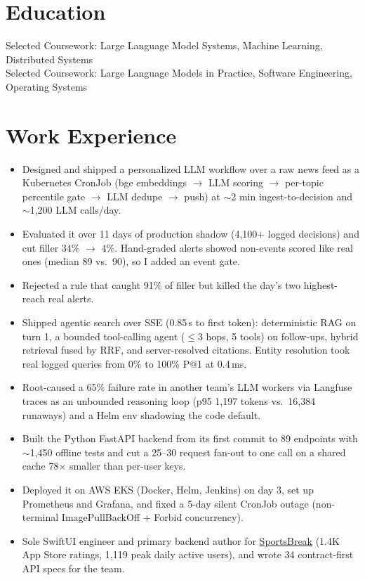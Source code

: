 \documentclass[11pt, letterpaper]{article}
\begin{document}

\section{Education}
Selected Coursework: Large Language Model Systems, Machine Learning, Distributed Systems\\[1pt]
Selected Coursework: Large Language Models in Practice, Software Engineering, Operating Systems

\section{Work Experience}
\begin{itemize}
  \item Designed and shipped a personalized LLM workflow over a raw news feed as a Kubernetes CronJob (bge embeddings $\to$ LLM scoring $\to$ per-topic percentile gate $\to$ LLM dedupe $\to$ push) at $\sim$2 min ingest-to-decision and $\sim$1{,}200 LLM calls/day.
  \item Evaluated it over 11 days of production shadow (4{,}100+ logged decisions) and cut filler 34\% $\to$ 4\%. Hand-graded alerts showed non-events scored like real ones (median 89 vs.\ 90), so I added an event gate.
  \item Rejected a rule that caught 91\% of filler but killed the day's two highest-reach real alerts.
  \item Shipped agentic search over SSE (0.85\,s to first token): deterministic RAG on turn 1, a bounded tool-calling agent ($\le$3 hops, 5 tools) on follow-ups, hybrid retrieval fused by RRF, and server-resolved citations. Entity resolution took real logged queries from 0\% to 100\% P@1 at 0.4\,ms.
  \item Root-caused a 65\% failure rate in another team's LLM workers via Langfuse traces as an unbounded reasoning loop (p95 1{,}197 tokens vs.\ 16{,}384 runaways) and a Helm env shadowing the code default.
  \item Built the Python FastAPI backend from its first commit to 89 endpoints with $\sim$1{,}450 offline tests and cut a 25--30 request fan-out to one call on a shared cache 78$\times$ smaller than per-user keys.
  \item Deployed it on AWS EKS (Docker, Helm, Jenkins) on day 3, set up Prometheus and Grafana, and fixed a 5-day silent CronJob outage (non-terminal ImagePullBackOff + Forbid concurrency).
  \item Sole SwiftUI engineer and primary backend author for \href{https://apps.apple.com/app/id6762649287}{SportsBreak} (1.4K App Store ratings, 1{,}119 peak daily active users), and wrote 34 contract-first API specs for the team.
\end{itemize}
\end{document}
